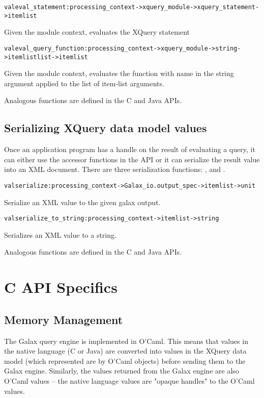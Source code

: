 \begin{alltt}
val eval\_statement 	   : processing\_context -> xquery\_module -> xquery\_statement -> item list
\end{alltt}
       Given the module context, evaluates the XQuery statement 

\begin{alltt}
val eval\_query\_function  : processing\_context -> xquery\_module -> string -> item list list -> item list
\end{alltt}
       Given the module context, evaluates the function with name in the
       string argument applied to the list of item-list arguments.

   Analogous functions are defined in the C and Java APIs.

\subsection{Serializing XQuery data model values}

  Once an application program has a handle on the result of evaluating
  a query, it can either use the accessor functions in the API or it
  can serialize the result value into an XML document.  There are
  three serialization functions: ,
   and . 

\begin{alltt}
val serialize  : processing\_context -> Galax\_io.output\_spec -> item list -> unit
\end{alltt}
    Serialize an XML value to the given galax output. 

\begin{alltt}
    val serialize\_to\_string : processing\_context -> item list -> string
\end{alltt}
Serializes an XML value to a string.

   Analogous functions are defined in the C and Java APIs.

\section{C API Specifics}

\subsection{Memory Management}
\label{sec:cmemory}
  The Galax query engine is implemented in O'Caml.  This means that
  values in the native language (C or Java) are converted into
  values in the XQuery data model (which represented are by O'Caml
  objects) before sending them to the Galax engine.  Similarly, the
  values returned from the Galax engine are also O'Caml values -- the
  native language values are "opaque handles" to the O'Caml values.

